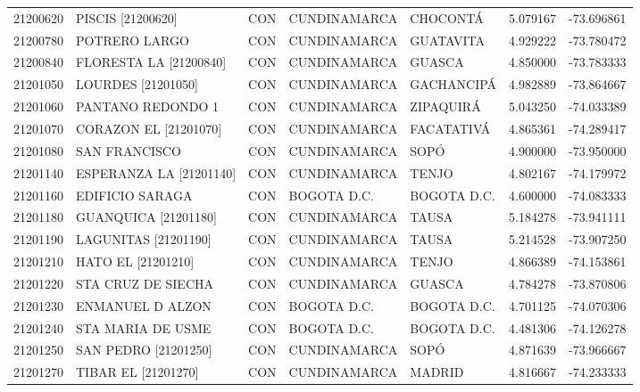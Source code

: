 \begin{longtable}{rllllrr}
 21200620 &           PISCIS [21200620] &  CON &     CUNDINAMARCA &          CHOCONTÁ &  5.079167 & -73.696861 \\
 21200780 &               POTRERO LARGO &  CON &     CUNDINAMARCA &         GUATAVITA &  4.929222 & -73.780472 \\
 21200840 &      FLORESTA LA [21200840] &  CON &     CUNDINAMARCA &            GUASCA &  4.850000 & -73.783333 \\
 21201050 &          LOURDES [21201050] &  CON &     CUNDINAMARCA &        GACHANCIPÁ &  4.982889 & -73.864667 \\
 21201060 &           PANTANO REDONDO 1 &  CON &     CUNDINAMARCA &         ZIPAQUIRÁ &  5.043250 & -74.033389 \\
 21201070 &       CORAZON EL [21201070] &  CON &     CUNDINAMARCA &        FACATATIVÁ &  4.865361 & -74.289417 \\
 21201080 &               SAN FRANCISCO &  CON &     CUNDINAMARCA &              SOPÓ &  4.900000 & -73.950000 \\
 21201140 &     ESPERANZA LA [21201140] &  CON &     CUNDINAMARCA &             TENJO &  4.802167 & -74.179972 \\
 21201160 &             EDIFICIO SARAGA &  CON &      BOGOTA D.C. &       BOGOTA D.C. &  4.600000 & -74.083333 \\
 21201180 &        GUANQUICA [21201180] &  CON &     CUNDINAMARCA &             TAUSA &  5.184278 & -73.941111 \\
 21201190 &        LAGUNITAS [21201190] &  CON &     CUNDINAMARCA &             TAUSA &  5.214528 & -73.907250 \\
 21201210 &        HATO EL   [21201210] &  CON &     CUNDINAMARCA &             TENJO &  4.866389 & -74.153861 \\
 21201220 &          STA CRUZ DE SIECHA &  CON &     CUNDINAMARCA &            GUASCA &  4.784278 & -73.870806 \\
 21201230 &            ENMANUEL D ALZON &  CON &      BOGOTA D.C. &       BOGOTA D.C. &  4.701125 & -74.070306 \\
 21201240 &           STA MARIA DE USME &  CON &      BOGOTA D.C. &       BOGOTA D.C. &  4.481306 & -74.126278 \\
 21201250 &        SAN PEDRO [21201250] &  CON &     CUNDINAMARCA &              SOPÓ &  4.871639 & -73.966667 \\
 21201270 &         TIBAR EL [21201270] &  CON &     CUNDINAMARCA &            MADRID &  4.816667 & -74.233333 \\

\end{longtable}
